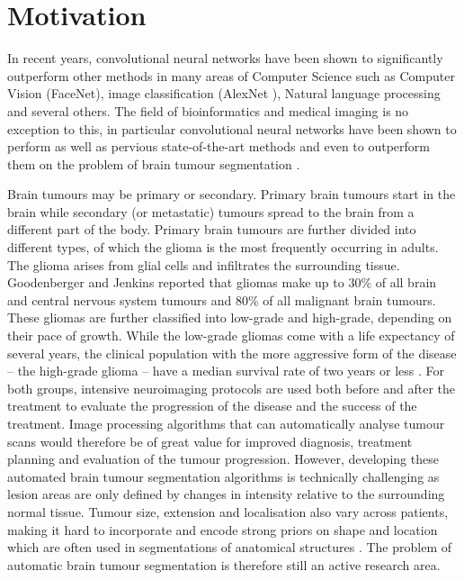 \documentclass[12pt,a4paper,twoside,openright]{report}
\begin{document}
\section{Motivation}
In recent years, convolutional neural networks have been shown to significantly outperform other methods in many areas of Computer Science such as Computer Vision (FaceNet\cite{face_net}), image classification (AlexNet \cite{alex_net}), Natural language processing \cite{nlp_deep_learning} and several others. The field of bioinformatics and medical imaging is no exception to this, in particular convolutional neural networks have been shown to perform as well as pervious state-of-the-art methods and even to outperform them on the problem of brain tumour segmentation \cite{pereira} \cite{brats_cnn_with_crf}.

Brain tumours may be primary or secondary. Primary brain tumours start in the brain while secondary (or metastatic) tumours spread to the brain from a different part of the body. Primary brain tumours are further divided into different types, of which the glioma is the most frequently occurring in adults. The  glioma arises from glial cells and infiltrates the surrounding tissue. Goodenberger and Jenkins \cite{gliomas_research} reported that gliomas make up to 30\% of all brain and central nervous system tumours and 80\% of all malignant brain tumours. These gliomas are further classified into low-grade and high-grade, depending on their pace of growth. While the low-grade gliomas come with a life expectancy of several years, the clinical population with the more aggressive form of the disease -- the high-grade glioma -- have a median survival rate of two years or less \cite{gliomas_life}. For both groups, intensive neuroimaging protocols are used both before and after the treatment to evaluate the progression of the disease and the success of the treatment. Image processing algorithms that can automatically analyse tumour scans would therefore be of great value for improved diagnosis, treatment planning and evaluation of the tumour progression. However, developing these automated brain tumour segmentation algorithms is technically challenging as lesion areas are only defined by changes in intensity relative to the surrounding normal tissue. Tumour size, extension and localisation also vary across patients, making it hard to incorporate and encode strong priors on shape and location which are often used in segmentations of anatomical structures \cite{brats-proceedings}. The problem of automatic brain tumour segmentation is therefore still an active research area. 
\end{document}

